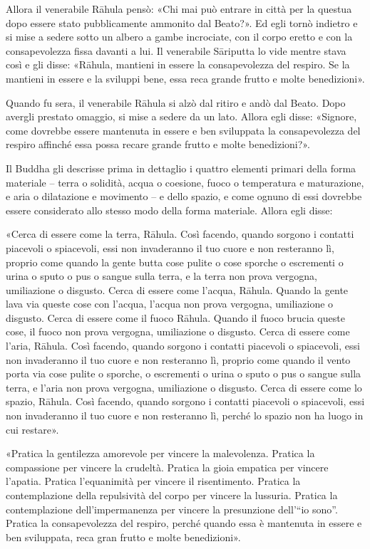 Allora il venerabile Rāhula pensò: «Chi mai può entrare in città per la questua
dopo essere stato pubblicamente ammonito dal Beato?». Ed egli tornò indietro e
si mise a sedere sotto un albero a gambe incrociate, con il corpo eretto e con
la consapevolezza fissa davanti a lui. Il venerabile Sāriputta lo vide mentre
stava così e gli disse: «Rāhula, mantieni in essere la consapevolezza del
respiro. Se la mantieni in essere e la sviluppi bene, essa reca grande frutto e
molte benedizioni».

Quando fu sera, il venerabile Rāhula si alzò dal ritiro e andò dal Beato. Dopo
avergli prestato omaggio, si mise a sedere da un lato. Allora egli disse:
«Signore, come dovrebbe essere mantenuta in essere e ben sviluppata la
consapevolezza del respiro affinché essa possa recare grande frutto e molte
benedizioni?».


 Il Buddha gli descrisse prima in dettaglio i
quattro elementi primari della forma materiale – terra o solidità, acqua o
coesione, fuoco o temperatura e maturazione, e aria o dilatazione e movimento –
e dello spazio, e come ognuno di essi dovrebbe essere considerato allo stesso
modo della forma materiale. Allora egli disse:

 «Cerca di essere come la terra, Rāhula. Così facendo, quando
sorgono i contatti piacevoli o spiacevoli, essi non invaderanno il tuo cuore e
non resteranno lì, proprio come quando la gente butta cose pulite o cose sporche
o escrementi o urina o sputo o pus o sangue sulla terra, e la terra non prova
vergogna, umiliazione o disgusto. Cerca di essere come l’acqua, Rāhula. Quando
la gente lava via queste cose con l’acqua, l’acqua non prova vergogna,
umiliazione o disgusto. Cerca di essere come il fuoco Rāhula. Quando il fuoco
brucia queste cose, il fuoco non prova vergogna, umiliazione o disgusto. Cerca
di essere come l’aria, Rāhula. Così facendo, quando sorgono i contatti piacevoli
o spiacevoli, essi non invaderanno il tuo cuore e non resteranno lì, proprio
come quando il vento porta via cose pulite o sporche, o escrementi o urina o
sputo o pus o sangue sulla terra, e l’aria non prova vergogna, umiliazione o
disgusto. Cerca di essere come lo spazio, Rāhula. Così facendo, quando sorgono i
contatti piacevoli o spiacevoli, essi non invaderanno il tuo cuore e non
resteranno lì, perché lo spazio non ha luogo in cui restare».

«Pratica la gentilezza amorevole per vincere la malevolenza. Pratica la
compassione per vincere la crudeltà. Pratica la gioia empatica per vincere
l’apatia. Pratica l’equanimità per vincere il risentimento. Pratica la
contemplazione della repulsività del corpo per vincere la lussuria. Pratica la
contemplazione dell’impermanenza per vincere la presunzione dell’“io sono”.
Pratica la consapevolezza del respiro, perché quando essa è mantenuta in essere
e ben sviluppata, reca gran frutto e molte benedizioni».

